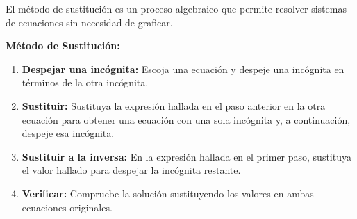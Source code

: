 \newpage

El método de sustitución es un proceso algebraico que permite resolver sistemas de ecuaciones sin necesidad de graficar.

\begin{theorem}
\textbf{Método de Sustitución:}

\begin{enumerate}
    \item \textbf{Despejar una incógnita:} Escoja una ecuación y despeje una incógnita en términos de la otra incógnita.

    \item \textbf{Sustituir:} Sustituya la expresión hallada en el paso anterior en la otra ecuación para obtener una ecuación con una sola incógnita y, a continuación, despeje esa incógnita.

    \item \textbf{Sustituir a la inversa:} En la expresión hallada en el primer paso, sustituya el valor hallado para despejar la incógnita restante.

    \item \textbf{Verificar:} Compruebe la solución sustituyendo los valores en ambas ecuaciones originales.
\end{enumerate}
\end{theorem}

